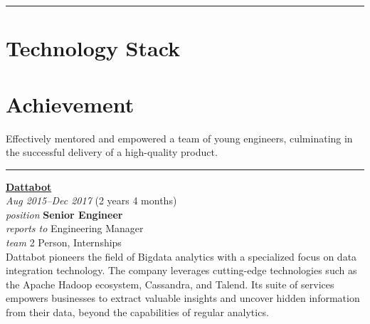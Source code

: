 \documentclass[12pt]{res}
\begin{document}
\begin{resume}
\vspace{-20pt}
\begin{minipage}[t]{0.55\linewidth}
	\rule{0.25\textwidth}{2pt}
	\begin{multicols}{2}
		\section{Technology Stack}
		\columnbreak
		\section{}
	\end{multicols}
	\vspace{1pt}
\end{minipage}
\hfill
\begin{minipage}[t]{0.42\linewidth}
	\vspace{18pt}
	\section{Achievement}
	\begin{flushleft}
        \footnotesize{\vspace{2.6pt}
Effectively mentored and empowered a team of young engineers, culminating in the successful delivery of a high-quality product.}
	\end{flushleft}
\end{minipage}

\vspace{10pt}
\rule{1.0\textwidth}{0.1pt}

\begin{multicols}{2}
	{\large {\bf \href{https://dattabot.io}{Dattabot}}} \\
	{\footnotesize{\sl Aug 2015--Dec 2017} \hfill (2 years 4 months)}\\
	{\footnotesize{\sl position} \hfill \bf{Senior Engineer}}\\
	{\footnotesize{\sl reports to} \hfill Engineering Manager}\\
	{\footnotesize{\sl team} \hfill 2 Person, Internships}\\

	\columnbreak
	{\footnotesize{Dattabot pioneers the field of Bigdata analytics with a specialized focus on data integration technology. The company leverages cutting-edge technologies such as the Apache Hadoop ecosystem, Cassandra, and Talend. Its suite of services empowers businesses to extract valuable insights and uncover hidden information from their data, beyond the capabilities of regular analytics.}}\\
\end{multicols}
\vspace{-20pt}


\end{resume}
\end{document}
